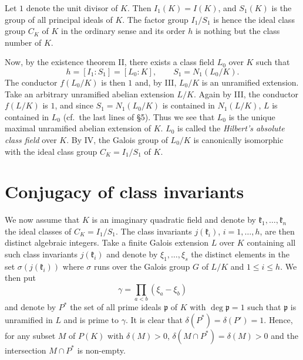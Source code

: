 Let $1$ denote the unit divisor of $K$. Then $I_{1}(K)=I(K)$, and
$S_{1}(K)$ is the group of all principal ideals of $K$. The factor group
$I_{1}/S_{1}$ is hence the ideal class group $C_{K}$ of $K$ in the
ordinary sense and its order $h$ is nothing but the class number of $K$.

Now, by the existence theorem II, there exists a class field $L_{0}$ over
$K$ such that
\[
h=[I_{1}:S_{1}]=[L_{0}:K],\qquad S_{1}=N_{1}(L_{0}/K).
\]
The conductor $f(L_{0}/K)$ is then $1$ and, by III, $L_{0}/K$ is an
unramified extension. Take an arbitrary unramified abelian extension
$L/K$. Again by III, the conductor $f(L/K)$ is $1$, and since
$S_{1}=N_{1}(L_{0}/K)$ is contained in $N_{1}(L/K)$, $L$ is contained in
$L_{0}$ (cf.\ the last lines of §5). Thus we see that $L_{0}$ is the
unique maximal unramified abelian extension of $K$. $L_{0}$ is called the
\emph{Hilbert's absolute class field} over $K$. By IV, the Galois group
of $L_{0}/K$ is canonically isomorphic with the ideal class group
$C_{K}=I_{1}/S_{1}$ of $K$.

\section{Conjugacy of class invariants}\label{sec:V-conjugacy}

We now assume that $K$ is an imaginary quadratic field and denote by
$\mathfrak{k}_{1},\ldots,\mathfrak{k}_{n}$ the ideal classes of
$C_{K}=I_{1}/S_{1}$. The class invariants $j(\mathfrak{k}_{i})$,
$i=1,\ldots,h$, are then distinct algebraic integers. Take a finite Galois
extension $L$ over $K$ containing all such class invariants
$j(\mathfrak{k}_{i})$ and denote by $\xi_{1},\ldots,\xi_{s}$ the distinct
elements in the set $\sigma(j(\mathfrak{k}_{i}))$ where $\sigma$ runs over
the Galois group $G$ of $L/K$ and $1\leq i\leq h$. We then put
\[
\gamma=\prod_{a<b}(\xi_{a}-\xi_{b})
\]
and denote by $P^{*}$ the set of all prime ideals $\mathfrak{p}$ of $K$
with $\deg\mathfrak{p}=1$ such that $\mathfrak{p}$ is unramified in $L$
and is prime to $\gamma$. It is clear that
$\delta(P^{*})=\delta(P')=1$. Hence, for any subset $M$ of $P(K)$ with
$\delta(M)>0$, $\delta(M\cap P^{*})=\delta(M)>0$ and the intersection
$M\cap P^{*}$ is non-empty.

